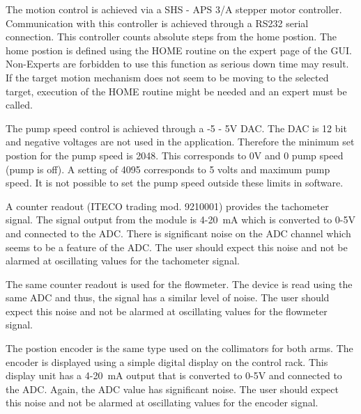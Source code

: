 {The motion control is achieved via a SHS - APS 3/A stepper motor controller.
Communication with this controller is achieved through a RS232 serial
connection. This controller counts absolute steps from the home postion.
The home postion is defined using the HOME routine on the expert page
of the GUI. Non-Experts are forbidden to use this function as serious
down time may result. If the target motion mechanism does not seem
to be moving to the selected target, execution of the HOME routine
might be needed and an expert must be called.

The pump speed control is achieved through a -5 - 5V DAC. The DAC
is 12 bit and negative voltages are not used in the application. Therefore
the minimum set postion for the pump speed is 2048. This corresponds
to 0V and 0 pump speed (pump is off). A setting of 4095 corresponds
to 5 volts and maximum pump speed. It is not possible to set the pump
speed outside these limits in software.

A counter readout (ITECO trading mod. 9210001) provides the tachometer
signal. The signal output from the module is 4-20~mA which is converted
to 0-5V and connected to the ADC. There is significant noise on the
ADC channel which seems to be a feature of the ADC. The user should
expect this noise and not be alarmed at oscillating values for the
tachometer signal.

The same counter readout is used for the flowmeter. The device is
read using the same ADC and thus, the signal has a similar level of
noise. The user should expect this noise and not be alarmed at oscillating
values for the flowmeter signal.

The postion encoder is the same type used on the collimators for both
arms. The encoder is displayed using a simple digital display on the
control rack. This display unit has a 4-20~mA output that is converted
to 0-5V and connected to the ADC. Again, the ADC value has significant
noise. The user should expect this noise and not be alarmed at oscillating
values for the encoder signal.


} %
